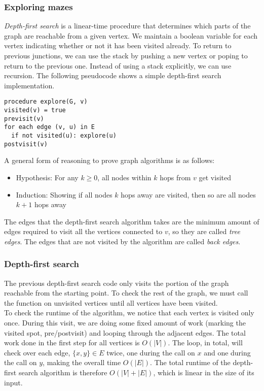 \subsubsection{Exploring mazes}
\textit{Depth-first search} is a linear-time procedure that determines which parts of the graph are reachable from a given vertex.
We maintain a boolean variable for each vertex indicating whether or not it has been visited already.
To return to previous junctions, we can use the stack by pushing a new vertex or poping to return to the previous one.
Instead of using a stack explicitly, we can use recursion.
The following pseudocode shows a simple depth-first search implementation.
\begin{verbatim}
procedure explore(G, v)
visited(v) = true
previsit(v)
for each edge (v, u) in E
  if not visited(u): explore(u)
postvisit(v)
\end{verbatim}
A general form of reasoning to prove graph algorithms is as follows:
\begin{itemize}
  \item{Hypothesis: For any $k \geq 0$, all nodes within $k$ hops from $v$ get visited}
  \item{Induction: Showing if all nodes $k$ hops away are visited, then so are all nodes $k+1$ hops away}
\end{itemize}
The edges that the depth-first search algorithm takes are the minimum amount of edges required to visit all the vertices connected to $v$, so they are called \textit{tree edges}.
The edges that are not visited by the algorithm are called \textit{back edges}.

\subsubsection{Depth-first search}
The previous depth-first search code only visits the portion of the graph reachable from the starting point.
To check the rest of the graph, we must call the function on unvisited vertices until all vertices have been visited.\\
To check the runtime of the algorithm, we notice that each vertex is visited only once.
During this visit, we are doing some fixed amount of work (marking the visited spot, pre/postvisit) and looping through the adjacent edges.
The total work done in the first step for all vertices is $O(|V|)$.
The loop, in total, will check over each edge, $\{x, y\} \in E$ twice, one during the call on $x$ and one during the call on $y$, making the overall time $O(|E|)$.
The total runtime of the depth-first search algorithm is therefore $O(|V| + |E|)$, which is linear in the size of its input.

